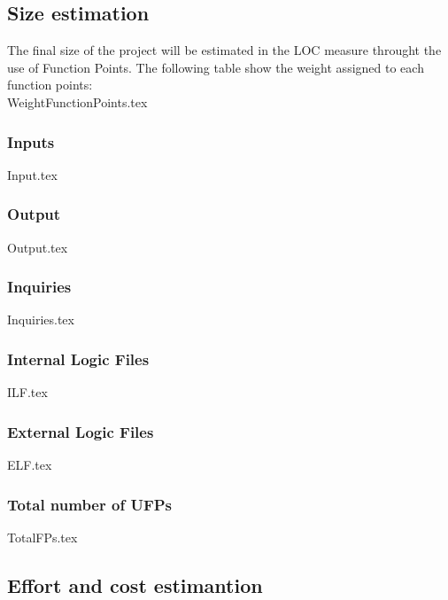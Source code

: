\subsection{Size estimation}
The final size of the project will be estimated in the  LOC measure throught the use of Function Points.
The following table show the weight assigned to each function points:\\

{WeightFunctionPoints.tex}

\subsubsection{Inputs}

{Input.tex}

\subsubsection{Output}
{Output.tex}

\subsubsection{Inquiries}
{Inquiries.tex}

\subsubsection{Internal Logic Files}
{ILF.tex}

\subsubsection{External Logic Files}
{ELF.tex}

\subsubsection{Total number of UFPs}
{TotalFPs.tex}

\subsection{Effort and cost estimantion}
